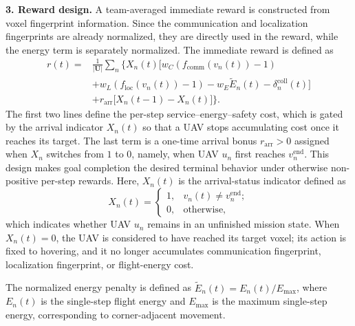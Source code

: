 \documentclass[lettersize,journal]{IEEEtran}
\begin{document}
\noindent\textbf{3. Reward design.}
A team-averaged immediate reward is constructed from voxel fingerprint information. Since the communication and localization fingerprints are already normalized, they are directly used in the reward, while the energy term is separately normalized. The immediate reward is defined as
\begin{equation}
\begin{aligned}
r(t)=&\frac{1}{|\mathbf{U}|}\sum_{n}\Big\{X_n(t)\Big[
 w_C(f_{\mathrm{comm}}(v_n(t))-1)\\
&+w_L(f_{\mathrm{loc}}(v_n(t))-1)-w_E\widetilde{E}_n(t)-\delta_n^{\mathrm{coll}}(t)\Big]\\
&+r_{\mathrm{arr}}\big[X_n(t-1)-X_n(t)\big]\Big\}.
\end{aligned}
\end{equation}
The first two lines define the per-step service--energy--safety cost, which is gated by the arrival indicator $X_n(t)$ so that a UAV stops accumulating cost once it reaches its target. The last term is a one-time arrival bonus $r_{\mathrm{arr}}>0$ assigned when $X_n$ switches from $1$ to $0$, namely, when UAV $u_n$ first reaches $v_n^{\mathrm{end}}$. This design makes goal completion the desired terminal behavior under otherwise non-positive per-step rewards.
Here, $X_n(t)$ is the arrival-status indicator defined as
\begin{equation}
X_n(t)=
\begin{cases}
1, & v_n(t)\neq v_n^{\mathrm{end}};\\
0, & \mathrm{otherwise},
\end{cases}
\end{equation}
which indicates whether UAV $u_n$ remains in an unfinished mission state. When $X_n(t)=0$, the UAV is considered to have reached its target voxel; its action is fixed to hovering, and it no longer accumulates communication fingerprint, localization fingerprint, or flight-energy cost.

The normalized energy penalty is defined as 
$\tilde{E}_n(t)=E_n(t)/E_{\max}$, where $E_n(t)$ is the single-step flight energy and 
$E_{\max}$ is the maximum single-step energy, corresponding to corner-adjacent movement.
\end{document}
